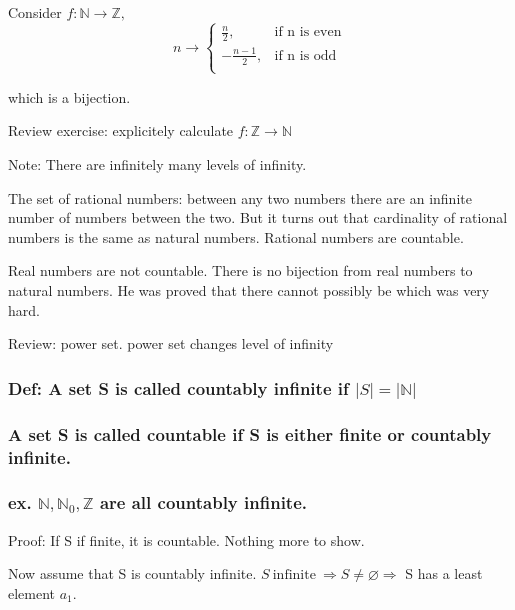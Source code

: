 \documentclass[class=scrartcl, crop=false]{standalone}
\begin{document}
 Consider  $f: \mathbb{N} \to \mathbb{Z}, $
 \[n \to
   \begin{cases} 
     \frac{n}{2}, & \text{if n is even} \\
     -\frac{n-1}{2}, & \text{if n is odd} \\
   \end{cases}
 \]

 which is a bijection.

 Review exercise: explicitely calculate $f: \mathbb{Z} \to \mathbb{N}$

 Note: There are infinitely many levels of infinity.

 The set of rational numbers: between any two numbers there are an infinite number of numbers between the two. But it turns out that cardinality of rational numbers is the same as natural numbers. Rational numbers are countable.

 Real numbers are not countable. There is no bijection from real numbers to natural numbers. He was proved that there cannot possibly be which was very hard.

 Review: power set. power set changes level of infinity


 \subsubsection*{ Def: A set S is called countably infinite if  $|S| = |\mathbb{N}|$ }

 \subsubsection*{A set S is called countable if S is either finite or countably infinite.}

 \subsubsection*{ex. $\mathbb{N}, \mathbb{N}_0, \mathbb{Z}$ are all countably infinite.}


 Proof: If S if finite, it is countable. Nothing more to show.

 Now assume that S is countably infinite. $S \ \text{infinite} \ \Rightarrow S \neq \varnothing \Rightarrow$ S has a least element $a_1$.
\end{document}

